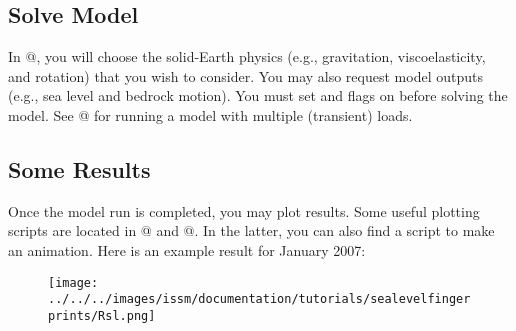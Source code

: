 \subsection{Solve Model} %
In @, you will choose the solid-Earth physics (e.g., gravitation, viscoelasticity, and
rotation) that you wish to consider. You may also request model outputs (e.g., sea level and bedrock
motion). You must set \verb@masstransport@ and \verb@slc@ flags on before solving the \verb@transient@
model. See @ for running a model with multiple (transient) loads.
\subsection{Some Results} %
Once the model run is completed, you may plot results. Some useful plotting scripts are located in
@ and @. In the latter, you can also find a script to make an animation.
Here is an example result for January 2007:
\begin{figure}[H]
	\begin{center}
		\texttt{[image: ../../../images/issm/documentation/tutorials/sealevelfingerprints/Rsl.png]}
	\end{center}
\end{figure}

